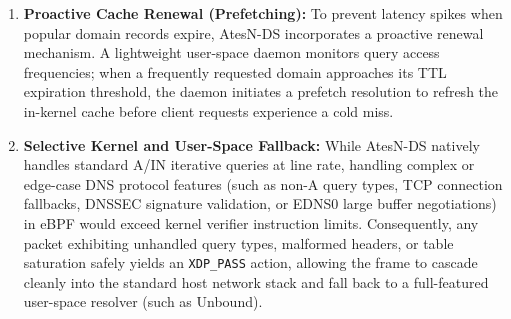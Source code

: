 \documentclass[a4paper,fleqn,colorlinks,hidelinks]{cas-sc}
\begin{document}
\begin{enumerate}
    \item \textbf{Proactive Cache Renewal (Prefetching):} To prevent latency spikes when popular domain records expire, AtesN-DS incorporates a proactive renewal mechanism. A lightweight user-space daemon monitors query access frequencies; when a frequently requested domain approaches its TTL expiration threshold, the daemon initiates a prefetch resolution to refresh the in-kernel cache before client requests experience a cold miss.
    \item \textbf{Selective Kernel and User-Space Fallback:} While AtesN-DS natively handles standard $\text{A}$/$\text{IN}$ iterative queries at line rate, handling complex or edge-case DNS protocol features (such as non-A query types, TCP connection fallbacks, DNSSEC signature validation, or EDNS0 large buffer negotiations) in eBPF would exceed kernel verifier instruction limits. Consequently, any packet exhibiting unhandled query types, malformed headers, or table saturation safely yields an \texttt{XDP\_PASS} action, allowing the frame to cascade cleanly into the standard host network stack and fall back to a full-featured user-space resolver (such as Unbound).
\end{enumerate}
\end{document}
